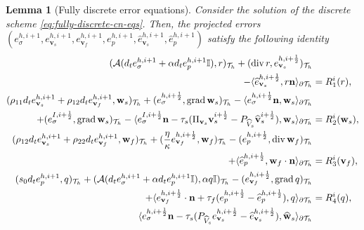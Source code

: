 \documentclass[10pt,letterpaper]{amsart}
\theoremstyle{plain} %
\newtheorem{lemma}[theorem]{Lemma} %
\theoremstyle{remark} %
\newcommand{\vect}[1]{\mathbf{#1}}
\newcommand{\divergence}{\mathrm{div}\,}
\newcommand{\grad}{\mathrm{grad}\,}
\newcommand{\Id}{\mathbb{I}} %
\newcommand{\Ael}{\mathcal{A}} %
\newcommand{\Thprod}[2]{( #1, #2 )_{\mathcal{T}_h}}
\newcommand{\pThprod}[2]{\langle #1, #2 \rangle_{\partial \mathcal{T}_{h}}}
\begin{document}
\begin{lemma}[Fully discrete error equations] 
Consider the solution of the discrete scheme \eqref{eq:fully-discrete-cn-eqs}. Then, the projected errors $(e_{\sigma}^{h,i+1}, e_{\vect{v}_s}^{h,i+1}, e_{\vect{v}_f}^{h,i+1}, e_{p}^{h,i+1}, \widehat{e}_{\vect{v}_s}^{h,i+1}, \widehat{e}_{p}^{h,i+1})$ satisfy the following identity 
%
\begin{subequations}
	\label{eq:fully-discrete-reduced-error-eqs}
	\begin{align}
		\label{eq:fully-discrete-reduced-error-eq1}
		\Thprod{\Ael(d_t e_{\sigma}^{h,i+1} + \alpha d_te_{p}^{h,i+1} \Id)}{r} +\Thprod{\divergence r}{e_{\vect{v}_{s}}^{h,i+\frac 12}} &
        \\
        \notag 
        -\pThprod{\widehat{e}_{\vect{v}_{s}}^{h,i+\frac 12}}{r \vect{n}} 
		&= R_1^i(r) ,
		\\ 
		\label{eq:fully-discrete-reduced-error-eq2}
		\Thprod{\rho_{11}d_t e_{\vect{v}_{s}}^{h,i+1}+\rho_{12}d_t e_{\vect{v}_{f}}^{h,i+1}}{\vect{w}_{s}} + \Thprod{e_{\sigma}^{h,i+\frac 12}}{\grad \vect{w}_{s}} - \pThprod{e_{\sigma}^{h,i+\frac 12} \vect{n} }{\vect{w}_{s}}&
		\\
		\notag
		\qquad + \Thprod{e_{\sigma}^{I,i+\frac 12}}{\grad \vect{w}_s} - \pThprod{e_{\sigma}^{I,i+\frac 12} \vect{n} - \tau_s (\Pi_{\vect{v}_s} \vect{v}_{s}^{i+\frac 12} - {P_{\widehat{V}_s}}\widehat{\vect{v}}_{s}^{i+\frac 12})}{\vect{w}_s} &= {R_2^i(\vect{w}_s)}, 
		\\
		\label{eq:fully-discrete-reduced-error-eq3}
		\Thprod{\rho_{12}d_t e_{\vect{v}_{s}}^{h,i+1}+\rho_{22}d_t e_{\vect{v}_{f}}^{h,i+1}}{\vect{w}_f} + \Thprod{\frac{\eta}{\kappa} e_{\vect{v}_{f}}^{h,i+\frac 12}}{\vect{w}_{f}} - \Thprod{e_p^{h,i+\frac 12} }{\divergence\vect{w}_{f}} &
		\\
		\notag
		+\pThprod{\widehat{e}_p^{h,i+\frac 12}}{\vect{w}_{f}\cdot\vect{n}} &= R_3^i(\vect{v}_f) , 
		\\
		\label{eq:fully-discrete-reduced-error-eq4}
		\Thprod{s_{0}d_t e_{p}^{h,i+1}}{q} + \Thprod{\Ael(d_t e_{\sigma}^{h,i+1}+\alpha d_t e_{p}^{h,i+1}\Id)}{\alpha q\Id} - \Thprod{e_{\vect{v}_{f}}^{h,i+\frac 12}}{\grad q} &
		\\
		\notag
		\quad+ \pThprod{e_{\vect{v}_{f}}^{h,i+\frac 12}\cdot \vect{n} + \tau_{f} (e_p^{h,i+\frac 12} - \widehat{e}_p^{h,i+\frac 12})}{q}  
		&= R_4^i(q) ,
		\\
		\label{eq:fully-discrete-reduced-error-eq5}
		\pThprod{e_{\sigma}^{h,i+\frac 12} \vect{n} - \tau_{s} ({P_{\widehat{V}_s}} e_{\vect{v}_{s}}^{h,i+\frac 12} - \widehat{e}_{\vect{v}_{s}}^{h,i+\frac 12})}{\widehat{\vect{w}}_{s}} &

\end{align}
\end{subequations}
\end{lemma}
\end{document}
